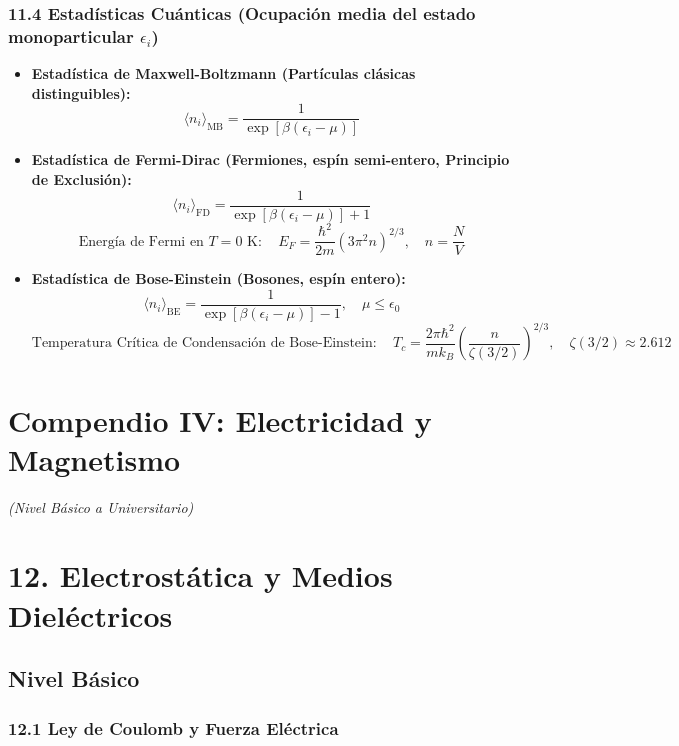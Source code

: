 \documentclass[11pt,a4paper]{article}
\begin{document}
\subsubsection*{11.4 Estadísticas Cuánticas (Ocupación media del estado monoparticular $\epsilon_i$)}

\begin{itemize}
  \item \textbf{Estadística de Maxwell-Boltzmann (Partículas clásicas distinguibles):}
  \[
    \langle n_i \rangle_{\text{MB}} = \frac{1}{\exp[\beta(\epsilon_i - \mu)]}
  \]
  \item \textbf{Estadística de Fermi-Dirac (Fermiones, espín semi-entero, Principio de Exclusión):}
  \[
    \langle n_i \rangle_{\text{FD}} = \frac{1}{\exp[\beta(\epsilon_i - \mu)] + 1}
  \]
  \[
    \text{Energía de Fermi en } T = 0\text{ K}: \quad E_F = \frac{\hbar^2}{2m} (3\pi^2 n)^{2/3}, \quad n = \frac{N}{V}
  \]
  \item \textbf{Estadística de Bose-Einstein (Bosones, espín entero):}
  \[
    \langle n_i \rangle_{\text{BE}} = \frac{1}{\exp[\beta(\epsilon_i - \mu)] - 1}, \quad \mu \le \epsilon_0
  \]
  \[
    \text{Temperatura Crítica de Condensación de Bose-Einstein}: \quad T_c = \frac{2\pi \hbar^2}{m k_B} \left( \frac{n}{\zeta(3/2)} \right)^{2/3}, \quad \zeta(3/2) \approx 2.612
  \]
\end{itemize}

\section*{Compendio IV: Electricidad y Magnetismo}

\textit{(Nivel Básico a Universitario)}

\section*{12. Electrostática y Medios Dieléctricos}

\subsection*{Nivel Básico}

\subsubsection*{12.1 Ley de Coulomb y Fuerza Eléctrica}
\end{document}
